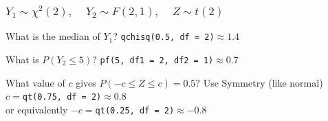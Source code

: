 \documentclass[handout]{beamer}
\begin{document}
\begin{frame}
\frametitle{$Y_1 \sim \chi^2(2),\;\;\;\; Y_2 \sim F(2,1),\;\;\;\; Z \sim t(2)$}
\begin{block}{What is the median of $Y_1$?}
\pause
\texttt{qchisq(0.5, df = 2)}$\approx 1.4$
\end{block}
\pause
\begin{block}{What is $P(Y_2 \leq 5)$?}
\pause
\texttt{pf(5, df1 = 2, df2 = 1)}$\approx 0.7$
\end{block}
\pause
\begin{block}{What value of $c$ gives $P(-c\leq Z \leq c) = 0.5$?}
Use Symmetry (like normal) \\
$c=$\texttt{qt(0.75, df = 2)}$\approx 0.8$ 
\pause
\\or equivalently $-c =$\texttt{qt(0.25, df = 2)}$\approx -0.8$
\end{block}

\end{frame}
\end{document}
